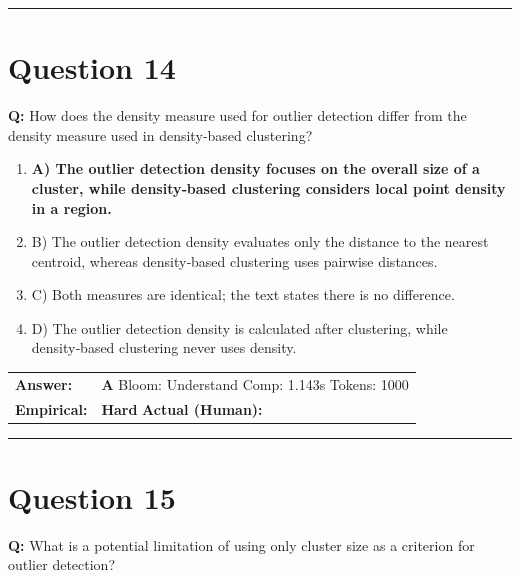 \documentclass[9pt]{article}
\begin{document}
\vspace{0.2cm}
\rule{\textwidth}{0.4pt}
\vspace{0.2cm}


\section*{Question 14}

\textbf{Q:} How does the density measure used for outlier detection differ from the density measure used in density‑based clustering?

\begin{enumerate}[label=\textbf{\alph{*})}, nosep]
    \item \textbf{A) The outlier detection density focuses on the overall size of a cluster, while density‑based clustering considers local point density in a region.} %
    \item B) The outlier detection density evaluates only the distance to the nearest centroid, whereas density‑based clustering uses pairwise distances.
    \item C) Both measures are identical; the text states there is no difference.
    \item D) The outlier detection density is calculated after clustering, while density‑based clustering never uses density.

\end{enumerate}

\begin{tabular}{@{}l p{10.5cm}@{}}
\textbf{Answer:} & \textbf{A} \hspace{1em} Bloom: Understand \hspace{1em} Comp: 1.143s \hspace{1em} Tokens: 1000 \\
\textbf{Empirical:} & \textbf{Hard} \hspace{1em} \textbf{Actual (Human):} \underline{\hspace{5cm}}
\end{tabular}

\vspace{0.2cm}
\rule{\textwidth}{0.4pt}
\vspace{0.2cm}


\section*{Question 15}

\textbf{Q:} What is a potential limitation of using only cluster size as a criterion for outlier detection?
\end{document}
